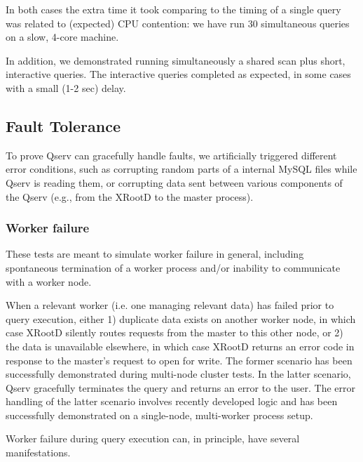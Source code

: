 \documentclass[DM,lsstdraft,toc]{lsstdoc}
\begin{document}
In both cases the extra time it took comparing to the timing of a single
query was related to (expected) CPU contention: we have run 30
simultaneous queries on a slow, 4-core machine.

In addition, we demonstrated running simultaneously a shared scan plus
short, interactive queries. The interactive queries completed as
expected, in some cases with a small (1-2 sec) delay.

\subsection{Fault Tolerance}\label{fault-tolerance-1}

To prove Qserv can gracefully handle faults, we artificially triggered
different error conditions, such as corrupting random parts of a
internal MySQL files while Qserv is reading them, or corrupting data
sent between various components of the Qserv (e.g., from the
XRootD to the master process).

\subsubsection{Worker failure}\label{worker-failure}

These tests are meant to simulate worker failure in general, including
spontaneous termination of a worker process and/or inability to
communicate with a worker node.

When a relevant worker (i.e. one managing relevant data) has failed
prior to query execution, either 1) duplicate data exists on another
worker node, in which case XRootD silently
routes requests from the master to this other node, or 2) the data is
unavailable elsewhere, in which case XRootD
returns an error code in response to the master's request to open for
write. The former scenario has been successfully demonstrated during
multi-node cluster tests. In the latter scenario, Qserv gracefully
terminates the query and returns an error to the user. The error
handling of the latter scenario involves recently developed logic and
has been successfully demonstrated on a single-node, multi-worker
process setup.

Worker failure during query execution can, in principle, have several
manifestations.
\end{document}
